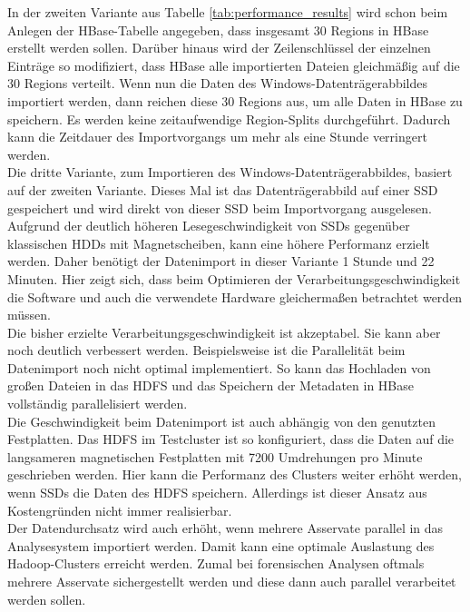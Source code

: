 \noindent
In der zweiten Variante aus Tabelle \ref{tab:performance_results} wird schon beim Anlegen der HBase-Tabelle angegeben, dass insgesamt 30 Regions in HBase erstellt werden sollen. Darüber hinaus wird der Zeilenschlüssel der einzelnen Einträge so modifiziert, dass HBase alle importierten Dateien gleichmäßig auf die 30 Regions verteilt. Wenn nun die Daten des Windows-Datenträgerabbildes importiert werden, dann reichen diese 30 Regions aus, um alle Daten in HBase zu speichern. Es werden keine zeitaufwendige Region-Splits durchgeführt. Dadurch kann die Zeitdauer des Importvorgangs um mehr als eine Stunde verringert werden.\\

\noindent
Die dritte Variante, zum Importieren des Windows-Datenträgerabbildes, basiert auf der zweiten Variante. Dieses Mal ist das Datenträgerabbild auf einer SSD gespeichert und wird direkt von dieser SSD beim Importvorgang ausgelesen. Aufgrund der deutlich höheren Lesegeschwindigkeit von SSDs gegenüber klassischen HDDs mit Magnetscheiben, kann eine höhere Performanz erzielt werden. Daher benötigt der Datenimport in dieser Variante 1 Stunde und 22 Minuten. Hier zeigt sich, dass beim Optimieren der Verarbeitungsgeschwindigkeit die Software und auch die verwendete Hardware gleichermaßen betrachtet werden müssen.\\

\noindent
Die bisher erzielte Verarbeitungsgeschwindigkeit ist akzeptabel. Sie kann aber noch deutlich verbessert werden. Beispielsweise ist die Parallelität beim Datenimport noch nicht optimal implementiert. So kann das Hochladen von großen Dateien in das HDFS und das Speichern der Metadaten in HBase vollständig parallelisiert werden.\\

\noindent
Die Geschwindigkeit beim Datenimport ist auch abhängig von den genutzten Festplatten. Das HDFS im Testcluster ist so konfiguriert, dass die Daten auf die langsameren magnetischen Festplatten mit 7200 Umdrehungen pro Minute geschrieben werden. 
Hier kann die Performanz des Clusters weiter erhöht werden, wenn SSDs die Daten des HDFS speichern. Allerdings ist dieser Ansatz aus Kostengründen nicht immer realisierbar.\\

\clearpage
\noindent
Der Datendurchsatz wird auch erhöht, wenn mehrere Asservate parallel in das Analysesystem importiert werden. 
Damit kann eine optimale Auslastung des Hadoop-Clusters erreicht werden. Zumal bei forensischen Analysen oftmals mehrere Asservate sichergestellt werden und diese dann auch parallel verarbeitet werden sollen.\\

